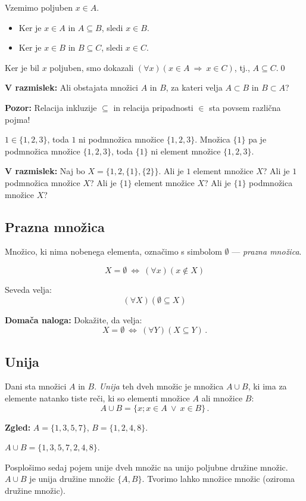 \documentclass[11pt,paper=b5,footinclude,headinclude]{scrbook} %
\def\ali {{~\vee~}}
\def\sledi {{~\Rightarrow~}}
\def\cee {{~\Leftrightarrow~}}
\begin{document}
Vzemimo poljuben $x\in A$.
\begin{itemize}
  \item Ker je $x\in A$ in $A\subseteq B$, sledi $x\in B$.
  \item Ker je $x\in B$ in $B\subseteq C$, sledi $x\in C$.
\end{itemize}
Ker je bil $x$ poljuben, smo dokazali $(\forall x)(x\in A\sledi x\in C)$, tj., $A\subseteq C$.\qed


\medskip
\noindent\textbf{ V razmislek:} Ali obstajata množici $A$ in $B$, za kateri velja $A\subset B$ in $B\subset A$?

\bigskip
\noindent\textbf{ Pozor:} Relacija inkluzije $\subseteq$ in relacija pripadnosti $\in$ sta povsem različna pojma!

$1\in\{1,2,3\}$, toda $1$ ni podmnožica množice $\{1,2,3\}$.
Množica $\{1\}$ pa je podmnožica množice $\{1,2,3\}$, toda
$\{1\}$ ni element množice $\{1,2,3\}$.

\bigskip
\noindent\textbf{ V razmislek:} Naj bo $X = \{1,2,\{1\},\{2\}\}$.
Ali je $1$ element množice $X$?
Ali je $1$ podmnožica množice $X$?
Ali je $\{1\}$ element množice $X$?
Ali je $\{1\}$ podmnožica množice $X$?

\bigskip
\subsection{Prazna množica}
Množico, ki nima nobenega elementa, označimo s simbolom $\emptyset$ --- {\em prazna množica}.

$$X = \emptyset \cee (\forall x)(x\not\in X)$$

Seveda velja:
$$(\forall X) (\emptyset \subseteq X)$$

\textbf{ Domača naloga:} Dokažite, da velja:
$$X = \emptyset\cee (\forall Y)(X\subseteq Y)\,.$$

\subsection{Unija}

Dani sta množici $A$ in $B$. {\em Unija} teh dveh množic je množica $A\cup B$, ki ima za elemente natanko tiste reči, ki so elementi množice $A$ ali množice $B$:
$$A\cup B = \{x; x\in A \ali x\in B\}\,.$$

\textbf{ Zgled:}
$A = \{1,3,5,7\}$, $B = \{1,2,4,8\}$.

$A\cup B = \{1,3,5,7,2,4,8\}$.

\medskip
Posplošimo sedaj pojem unije dveh množic na unijo poljubne družine množic.
$A\cup B$ je unija družine množic $\{A,B\}$.
Tvorimo lahko množice množic (oziroma družine množic).
\end{document}

